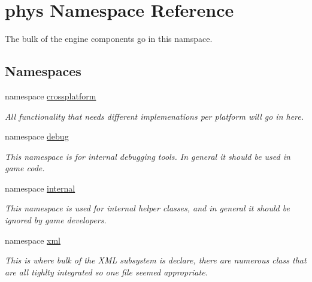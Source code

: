 \hypertarget{namespacephys}{
\section{phys Namespace Reference}
\label{df/dec/namespacephys}
}


The bulk of the engine components go in this namspace.  


\subsection*{Namespaces}
\begin{DoxyCompactItemize}
\item 
namespace \hyperlink{namespacephys_1_1crossplatform}{crossplatform}


\begin{DoxyCompactList}\small\item\em All functionality that needs different implemenations per platform will go in here. \item\end{DoxyCompactList}

\item 
namespace \hyperlink{namespacephys_1_1debug}{debug}


\begin{DoxyCompactList}\small\item\em This namespace is for internal debugging tools. In general it should be used in game code. \item\end{DoxyCompactList}

\item 
namespace \hyperlink{namespacephys_1_1internal}{internal}


\begin{DoxyCompactList}\small\item\em This namespace is used for internal helper classes, and in general it should be ignored by game developers. \item\end{DoxyCompactList}

\item 
namespace \hyperlink{namespacephys_1_1xml}{xml}


\begin{DoxyCompactList}\small\item\em This is where bulk of the XML subsystem is declare, there are numerous class that are all tighlty integrated so one file seemed appropriate. \item\end{DoxyCompactList}

\end{DoxyCompactItemize}
